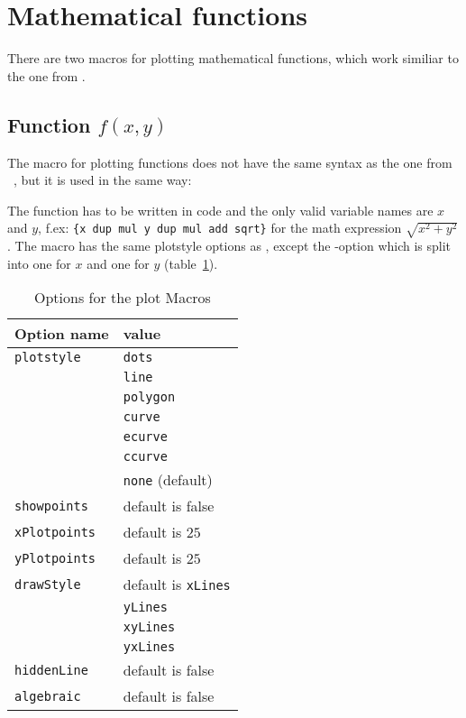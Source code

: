 \documentclass[11pt,english,BCOR10mm,DIV12,bibliography=totoc,parskip=false,smallheadings
    headexclude,footexclude,oneside,dvipsnames,svgnames]{pst-doc}
\begin{document}
\section{Mathematical functions}
There are two macros for plotting mathematical functions, which work similiar to the one from .

\subsection{Function $f(x,y)$}

The macro for plotting functions does not have the same syntax as the one from 
~\cite{dtk02.1:voss:mathematischen}, but it is used in the same way:

\begin{BDef}
\OptArgs{}
\end{BDef}

The function has to be written in \PS{} code and the only valid variable names are  $x$ 
and $y$, f.ex: \verb|{x dup mul y dup mul add sqrt}| for the math expression $\sqrt{x^2 + y^2}$. 
The macro has the same plotstyle options as , except the -option which is 
split into one for $x$ and one for $y$ (table~\ref{tab:lineOptions}).

\begin{table}[htb]
\centering
\caption{Options for the plot Macros}\label{tab:lineOptions}
\smallskip
\begin{tabular}{l|l}
\textbf{Option name} & \textbf{value}\\\hline
\verb|plotstyle| &
	\verb|dots|\\
&	\verb|line|\\
&	\verb|polygon|\\
&	\verb|curve|\\
&	\verb|ecurve|\\
&	\verb|ccurve|\\
&	\verb|none| (default)\\
\verb|showpoints|  & default is false\\
\verb|xPlotpoints| & default is $25$\\
\verb|yPlotpoints| & default is $25$\\
\verb|drawStyle| & default is \verb|xLines|\\
& \verb|yLines|\\
& \verb|xyLines|\\
& \verb|yxLines|\\
\verb|hiddenLine|  & default is false\\
\verb|algebraic| & default is false
\end{tabular}
\end{table}
\end{document}
